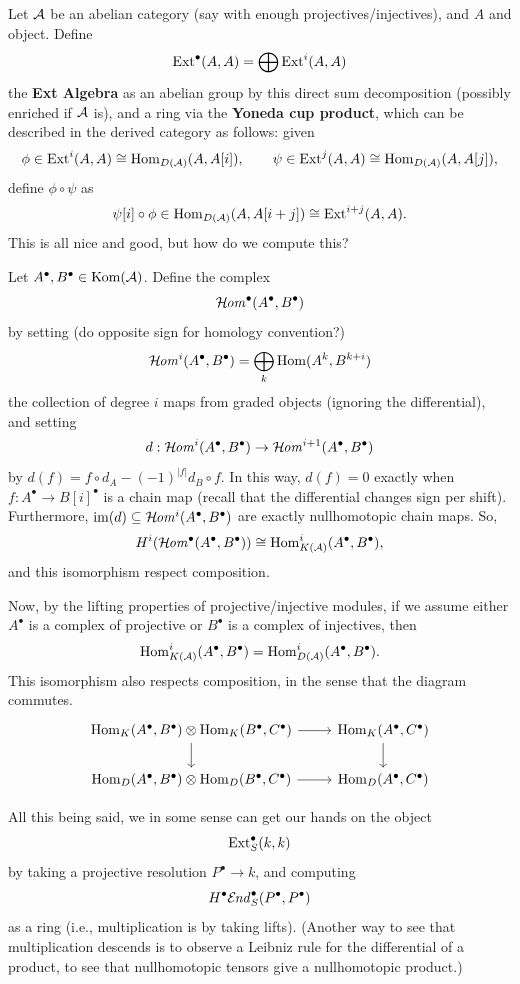 \documentclass[12pt]{article}
\DeclareMathOperator{\Kom}{Kom}
\begin{document}
Let $\mathcal{A}$ be an abelian category (say with enough projectives/injectives), and $A$ and object. Define
\[\mathrm{Ext}^\bullet(A,A) = \bigoplus \mathrm{Ext}^i(A,A)\]
the \textbf{Ext Algebra} as an abelian group by this direct sum decomposition (possibly enriched if $\mathcal{A}$ is), and a ring via the \textbf{Yoneda cup product}, which can be described in the derived category as follows: given
\[\phi \in \Ext^i(A,A)\cong \Hom_{D(\cA)}(A,A[i]), \qquad \psi \in \Ext^j(A,A) \cong \Hom_{D(\cA)}(A,A[j]),\]
define $\phi\circ \psi$ as
\[\psi[i]\circ \phi \in \Hom_{D(\cA)}(A,A[i+j]) \cong \Ext^{i+j}(A,A).\]
This is all nice and good, but how do we compute this?

Let $A^\bullet, B^\bullet \in \Kom(\cA)$. Define the complex
\[\mathcal{H}\kern -1pt \mathit{om}^\bullet(A^\bullet,B^\bullet)\]
by setting (do opposite sign for homology convention?)
\[\mathcal{H}\kern -1pt \mathit{om}^i(A^\bullet,B^\bullet) = \bigoplus_k \mathrm{Hom}(A^k,B^{k+i})\]
the collection of degree $i$ maps from graded objects (ignoring the differential), and setting
\[d: \mathcal{H}\kern -1pt \mathit{om}^i(A^\bullet, B^\bullet) \to \mathcal{H}\kern -1pt \mathit{om}^{i+1}(A^\bullet, B^\bullet)\]
by $d(f) = f\circ d_A - (-1)^{|f|} d_B\circ f$. In this way, $d(f)=0$ exactly when $f:A^\bullet\to B[i]^\bullet$ is a chain map (recall that the differential changes sign per shift). Furthermore, $\mathrm{im} (d)\subseteq \mathcal{H}\kern -1pt \mathit{om}^i(A^\bullet,B^\bullet)$ are exactly nullhomotopic chain maps. So,
\[H^i(\mathcal{H}\kern -1pt \mathit{om}^\bullet(A^\bullet,B^\bullet)) \cong \mathrm{Hom}^i_{K(\mathcal{A})}(A^\bullet,B^\bullet),\]
and this isomorphism respect composition.

Now, by the lifting properties of projective/injective modules, if we assume either $A^\bullet$ is a complex of projective or $B^\bullet$ is a complex of injectives, then
\[\mathrm{Hom}^i_{K(\mathcal{A})}(A^\bullet, B^\bullet) = \mathrm{Hom}^i_{D(\mathcal{A})}(A^\bullet,B^\bullet).\]
This isomorphism also respects composition, in the sense that the diagram commutes.
\[\begin{tikzcd}
\Hom_K(A^\bullet,B^\bullet) \otimes \Hom_K(B^\bullet, C^\bullet) \rar \dar & \Hom_K(A^\bullet, C^\bullet) \dar\\
\Hom_D(A^\bullet,B^\bullet) \otimes \Hom_D(B^\bullet, C^\bullet) \rar & \Hom_D(A^\bullet, C^\bullet)
\end{tikzcd}\]

All this being said, we in some sense can get our hands on the object
\[\mathrm{Ext}^\bullet_S(k,k)\]
by taking a projective resolution $P^\bullet \to k$, and computing
\[H^\bullet \mathcal{E}\kern -1pt \mathit{nd}_S^\bullet(P^\bullet,P^\bullet)\]
as a ring (i.e., multiplication is by taking lifts). (Another way to see that multiplication descends is to observe a Leibniz rule for the differential of a product, to see that nullhomotopic tensors give a nullhomotopic product.)
\end{document}
